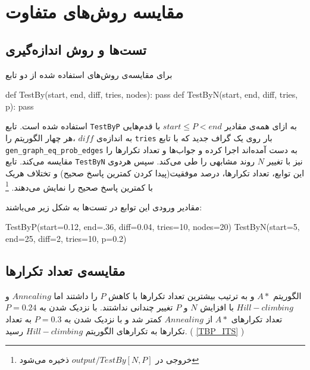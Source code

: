 

\chapter{مقایسه روش‌های متفاوت}
\section{تست‌ها و روش اندازه‌گیری}
برای مقایسه‌ی روش‌های استفاده شده از دو تابع 

\begin{latin}
\begin{python}
def TestBy(start, end, diff, tries, nodes):
	pass
def TestByN(start, end, diff, tries, p):
	pass
\end{python}
\end{latin}

استفاده شده است. تابع
\verb;TestByP;
به ازای همه‌ی مقادیر
$start\leq P < end$
با قدم‌هایی به اندازه‌ی 
$diff$
،هر چهار الگوریتم را 
\verb;tries;
بار روی  یک گراف جدید که با تابع 
\verb;gen_graph_eq_prob_edges;
به دست آمده‌اند اجرا کرده و  جواب‌ها و تعداد تکرار‌ها را مقایسه می‌کند.
تابع 
\verb;TestByN;
نیز با تغییر 
$N$
روند مشابهی را طی می‌کند.
سپس هردوی این توابع، تعداد تکرارها، درصد موفقیت(پیدا کردن کمترین پاسخ صحیح) و تختلاف هریک با کمترین پاسخ صحیح را نمایش می‌دهند.
\footnote{خروجی در $output/TestBy[N,P]$ ذخیره می‌شود}

مقادیر ورودی این توابع در تست‌ها به شکل زیر می‌باشند:
\begin{latin}
\begin{python}
TestByP(start=0.12, end=.36, diff=0.04, tries=10, nodes=20)
TestByN(start=5, end=25, diff=2, tries=10, p=0.2)
\end{python}
\end{latin}


\section{مقایسه‌ی تعداد تکرارها}
الگوریتم 
$A*$
و
به ترتیب بیشترین تعداد تکرار‌ها با کاهش 
$P$
را داشتند اما
$Annealing$
و
$Hill-climbing$
با افزایش 
$N$
و
$P$
تغییر چندانی نداشتند.
با نزدیک شدن به 
$P=0.24$
تعداد تکرارهای
$A*$
از
$Annealing$
کمتر شد و با نزدیک شدن به
$P=0.3$
به تعداد تکرار‌ها به تکرارهای الگوریتم
$Hill-climbing$
رسید.
(
\cref{TBP_ITS}
)

